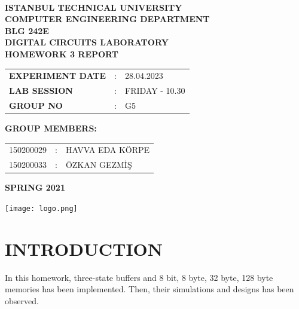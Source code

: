 \documentclass[pdftex,12pt,a4paper]{article}
\begin{document}
\begin{titlepage}
\begin{center}
\textbf{}\\
\textbf{\Large{ISTANBUL TECHNICAL UNIVERSITY}}\\
\vspace{0.5cm}
\textbf{\Large{COMPUTER ENGINEERING DEPARTMENT}}\\
\vspace{2cm}
\textbf{\Large{BLG 242E\\ DIGITAL CIRCUITS LABORATORY\\ HOMEWORK 3 REPORT}}\\
\vspace{2.8cm}
\begin{table}[ht]
\centering
\Large{
\begin{tabular}{lcl}
\textbf{EXPERIMENT DATE}  & : & 28.04.2023 \\
\textbf{LAB SESSION}  & : & FRIDAY - 10.30 \\
\textbf{GROUP NO}  & : & G5 \\
\end{tabular}}
\end{table}
\vspace{1cm}
\textbf{\Large{GROUP MEMBERS:}}\\
\begin{table}[ht]
\centering
\Large{
\begin{tabular}{rcl}
150200029  & : & HAVVA EDA KÖRPE \\
150200033  & : & ÖZKAN GEZMİŞ \\

\end{tabular}}
\end{table}
\vspace{2.8cm}
\textbf{\Large{SPRING 2021}}

\end{center}
\texttt{[image: logo.png]}
\end{titlepage}

\thispagestyle{empty}
\setcounter{tocdepth}{4}
\tableofcontents
\clearpage

\setcounter{page}{1}

\section{INTRODUCTION}
In this homework, three-state buffers and 8 bit, 8 byte, 32 byte, 128 byte memories has been implemented. Then, their simulations and designs has been observed.
\end{document}
